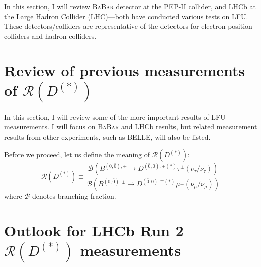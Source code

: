 \documentclass[12pt,letterpaper]{article}
\newcommand{\PRLrule}{
    \bigskip
    \noindent\makebox[\linewidth]{
        \resizebox{0.3333\linewidth}{1pt}{$\blacklozenge$}
    }
    \bigskip
}
\def\BaBar/{\textsc{BaBar}}
\def\RDDst/{\ensuremath{\mathcal{R}(D^{(*)})}}
\begin{document}
In this section, I will review \BaBar/ detector at the PEP-II collider, and LHCb
at the Large Hadron Collider (LHC)---both have conducted various tests on LFU.
These detectors/colliders are representative of the detectors for
electron-position colliders and hadron colliders.





\section{Review of previous measurements of \RDDst/}
In this section, I will review some of the more important results of LFU
measurements.
I will focus on \BaBar/ and LHCb results, but related measurement results from
other experiments, such as BELLE, will also be listed.

Before we proceed, let us define the meaning of \RDDst/:
\begin{equation*}
    \RDDst/ \equiv \frac{
        \mathcal{B}\left(
        B^{(0,\bar{0}),\pm} \longrightarrow D^{(\bar{0},0),\mp(*)} \tau^{\pm}
            \left(\nu_{\tau}/\bar{\nu}_{\tau}\right)\right)
        }{
        \mathcal{B}\left(
        B^{(0,\bar{0}),\pm} \longrightarrow D^{(\bar{0},0),\mp(*)} \mu^{\pm}
            \left(\nu_{\mu}/\bar{\nu}_{\mu}\right)\right)
        }
\end{equation*}
where $\mathcal{B}$ denotes branching fraction.






\section{Outlook for LHCb Run 2 \RDDst/ measurements}



\PRLrule
\printbibliography
\end{document}
